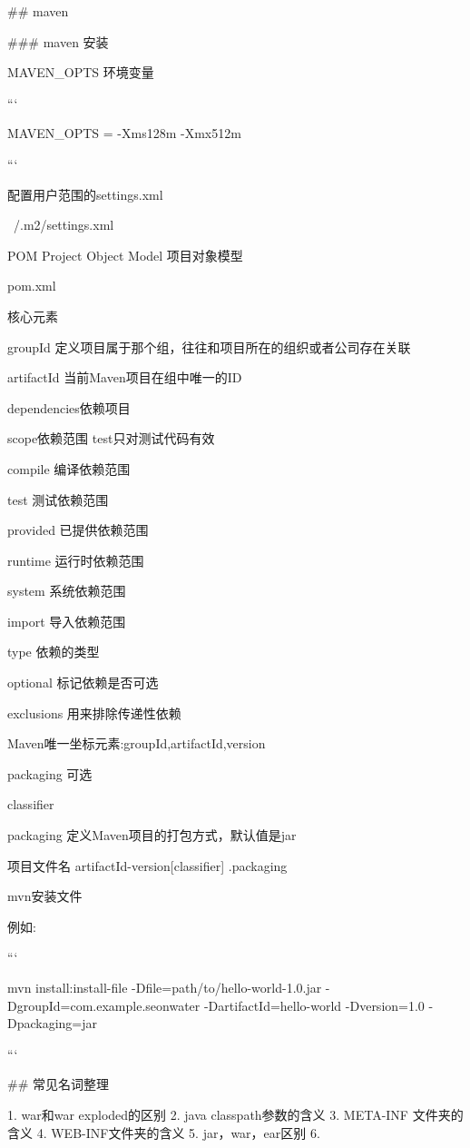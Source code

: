 ## maven

### maven 安装

MAVEN_OPTS 环境变量

```

MAVEN_OPTS = -Xms128m -Xmx512m

```

配置用户范围的settings.xml

~/.m2/settings.xml

POM Project Object Model 项目对象模型

pom.xml

核心元素

groupId 定义项目属于那个组，往往和项目所在的组织或者公司存在关联

artifactId 当前Maven项目在组中唯一的ID


dependencies依赖项目

scope依赖范围   test只对测试代码有效

    compile 编译依赖范围
    
    test    测试依赖范围

    provided 已提供依赖范围

    runtime 运行时依赖范围

    system 系统依赖范围

    import 导入依赖范围
    


type 依赖的类型

optional 标记依赖是否可选

exclusions 用来排除传递性依赖


Maven唯一坐标元素:groupId,artifactId,version

packaging 可选

classifier 


packaging 定义Maven项目的打包方式，默认值是jar

项目文件名 artifactId-version[classifier] .packaging


mvn安装文件

例如:

```

mvn install:install-file -Dfile=path/to/hello-world-1.0.jar -DgroupId=com.example.seonwater -DartifactId=hello-world -Dversion=1.0 -Dpackaging=jar

```




## 常见名词整理

1. war和war exploded的区别
2. java classpath参数的含义
3. META-INF 文件夹的含义
4. WEB-INF文件夹的含义
5. jar，war，ear区别
6. 






